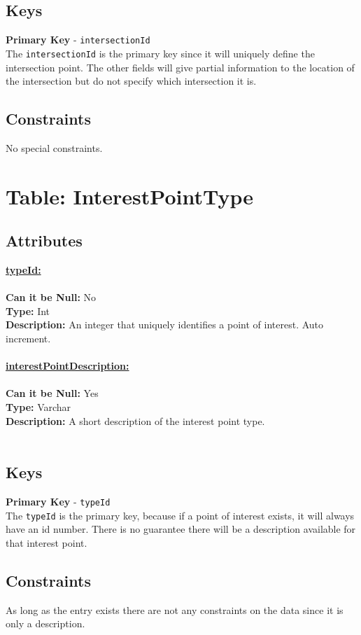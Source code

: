 \subsection{Keys}
\textbf{Primary Key} - \texttt{intersectionId}\\
The \texttt{intersectionId} is the primary key since it will uniquely define the intersection 
point. The other fields will give partial information to the location of the 
intersection but do not specify which intersection it is. 

\subsection{Constraints}
No special constraints.

\newpage
\section{Table: InterestPointType}
\subsection{Attributes}
\textbf{\underline{typeId:}}\\
\\
\textbf{Can it be Null:} No\\
\textbf{Type:} Int\\
\textbf{Description:}
An integer that uniquely identifies a point of interest. Auto increment.\\\\
\textbf{\underline{interestPointDescription:}}\\
\\
\textbf{Can it be Null:} Yes\\
\textbf{Type:} Varchar\\
\textbf{Description:} A short description 
of the interest point type. \\\\


\subsection{Keys}
\textbf{Primary Key} - \texttt{typeId}\\
The \texttt{typeId} is the primary key, because if a point of interest 
exists, it will always have an id number. There is no 
guarantee there will be a description available for that interest point.
\subsection{Constraints} 
As long as the entry exists there are not any constraints 
on the data since it is only a description.

